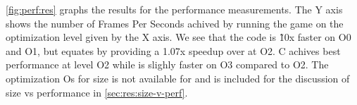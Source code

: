 \autoref{fig:perf:res} graphs the results for the performance measurements.
The Y axis shows the number of Frames Per Seconds achived by running the game on the optimization level given by the X axis.
We see that the {\C} code is \~10x faster on O0 and O1, but {\rust} equates by providing a 1.07x speedup over {\C} at O2.
C achives best performance at level O2 while {\rust} is slighly faster on O3 compared to O2.
The optimization Os for size is not available for {\rust} and is included for the discussion of size vs performance in \autoref{sec:res:size-v-perf}.

